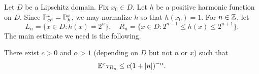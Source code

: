 \mpagebreak


Let $D$ be a Lipschitz domain. Fix $x_0 \in D$. Let $h$ be a positive harmonic function on $D$. Since $\P_{ch}^x = \P_h^x$, we may normalize $h$ so that $h(x_0) = 1$. For $n \in \Z$, let
\begin{equation}\label{eq:ch3_3.1}
    L_n = \{x \in D : h(x) = 2^n\}, \quad R_n = \{x \in D : 2^{n-1} \leq h(x) \leq 2^{n+1}\}.
\end{equation}
The main estimate we need is the following.

\begin{theorem}\label{thm:ch3_3.2}
There exist $c > 0$ and $\alpha > 1$ (depending on $D$ but not $n$ or $x$) such that
\[
    \E^x\tau_{R_n} \leq c(1 + |n|)^{-\alpha}.
\]
\end{theorem}

